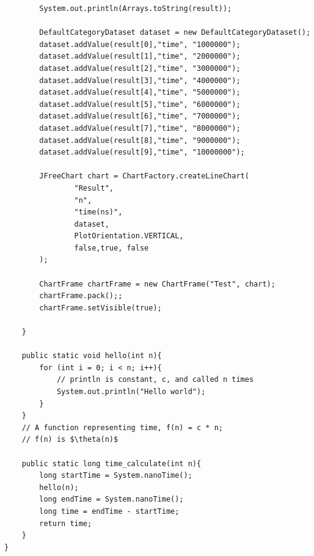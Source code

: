 \documentclass{article}
\newenvironment{sol}[1][Solution]{\begin{trivlist}\item[\hskip\labelsep {\bfseries #1:}]}{\end{trivlist}}
\begin{document}
\begin{enumerate}
\begin{sol}
\begin{enumerate}
\begin{verbatim}
        System.out.println(Arrays.toString(result));

        DefaultCategoryDataset dataset = new DefaultCategoryDataset();
        dataset.addValue(result[0],"time", "1000000");
        dataset.addValue(result[1],"time", "2000000");
        dataset.addValue(result[2],"time", "3000000");
        dataset.addValue(result[3],"time", "4000000");
        dataset.addValue(result[4],"time", "5000000");
        dataset.addValue(result[5],"time", "6000000");
        dataset.addValue(result[6],"time", "7000000");
        dataset.addValue(result[7],"time", "8000000");
        dataset.addValue(result[8],"time", "9000000");
        dataset.addValue(result[9],"time", "10000000");

        JFreeChart chart = ChartFactory.createLineChart(
                "Result",
                "n",
                "time(ns)",
                dataset,
                PlotOrientation.VERTICAL,
                false,true, false
        );

        ChartFrame chartFrame = new ChartFrame("Test", chart);
        chartFrame.pack();;
        chartFrame.setVisible(true);

    }

    public static void hello(int n){
        for (int i = 0; i < n; i++){
            // println is constant, c, and called n times
            System.out.println("Hello world");
        }
    }
    // A function representing time, f(n) = c * n;
    // f(n) is $\theta(n)$

    public static long time_calculate(int n){
        long startTime = System.nanoTime();
        hello(n);
        long endTime = System.nanoTime();
        long time = endTime - startTime;
        return time;
    }
}
\end{verbatim}


\end{enumerate}
\end{sol}
\end{enumerate}
\end{document}
